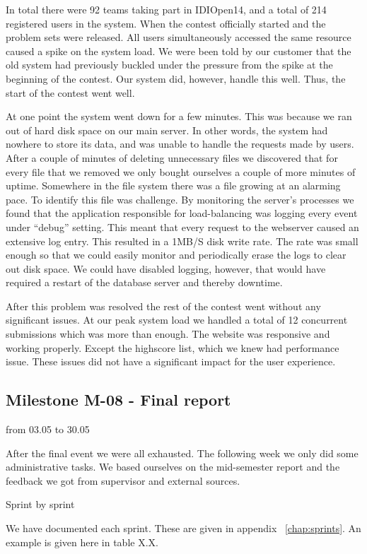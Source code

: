 In total there were 92 teams taking part in IDIOpen14, and a total of
214 registered users in the system. When the contest officially started
and the problem sets were released. All users simultaneously accessed
the same resource caused a spike on the system load. We were been told
by our customer that the old system had previously buckled under the
pressure from the spike at the beginning of the contest. Our system
did, however, handle this well. Thus, the start of the contest went
well. 




At one point the system went down for a few minutes. This was because we
ran out of hard disk space on our main server. In other words, the
system had nowhere to store its data, and was unable to handle the
requests made by users. After a couple of minutes of deleting
unnecessary files we discovered that for every file that we removed we
only bought ourselves a couple of more minutes of uptime. Somewhere in
the file system there was a file growing at an alarming pace. To
identify this file was challenge. By monitoring the
server's processes we found that the application
responsible for load-balancing was logging every event under
``debug'' setting. This meant that
every request to the webserver caused an extensive log entry. This
resulted in a 1MB/S disk write rate. The rate was small enough so that
we could easily monitor and periodically erase the logs to clear out
disk space. We could have disabled logging, however, that would have
required a restart of the database server and thereby downtime. 




After this problem was resolved the rest of the contest went without any
significant issues. At our peak system load we handled a total of 12
concurrent submissions which was more than enough. The website was
responsive and working properly. Except the highscore list, which we
knew had performance issue. These issues did not have a significant
impact for the user experience.




\subsection{Milestone M-08 - Final report}
\label{sec:M08}
from 03.05 to 30.05

After the final event we were all exhausted. The following week we only
did some administrative tasks. We based ourselves on the mid-semester
report and the feedback we got from supervisor and external sources. 




Sprint by sprint

We have documented each sprint. These are given in appendix ~\ref{chap:sprints}. An
example is given here in table X.X.\newline

